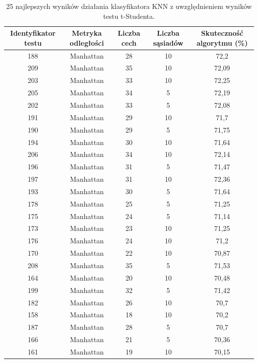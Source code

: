 \documentclass{article}
\begin{document}
\begin{center}
	\begin{longtable}{ |c|c|c|c|c| }
		\caption{25 najlepszych wyników działania klasyfikatora KNN z uwzględnieniem wyników testu t-Studenta.}
		\label{tab:wyniki_po_t}\\
		\hline
			Identyfikator testu & Metryka odległości & Liczba cech & Liczba sąsiadów & Skuteczność algorytmu (\%) \\
		\hline
            188 & Manhattan & 28 & 10 & 72,2\\
            209 & Manhattan & 35 & 10 & 72,09\\
            203 & Manhattan & 33 & 10 & 72,25\\
            205 & Manhattan & 34 & 5 & 72,19\\
            202 & Manhattan & 33 & 5 & 72,08\\
            191 & Manhattan & 29 & 10 & 71,7\\
            190 & Manhattan & 29 & 5 & 71,75\\
            194 & Manhattan & 30 & 10 & 71,64\\
            206 & Manhattan & 34 & 10 & 72,14\\
            196 & Manhattan & 31 & 5 & 71,47\\
            197 & Manhattan & 31 & 10 & 72,36\\
            193 & Manhattan & 30 & 5 & 71,64\\
            178 & Manhattan & 25 & 5 & 71,25\\
            175 & Manhattan & 24 & 5 & 71,14\\
            173 & Manhattan & 23 & 10 & 71,25\\
            176 & Manhattan & 24 & 10 & 71,2\\
            170 & Manhattan & 22 & 10 & 70,87\\
            208 & Manhattan & 35 & 5 & 71,53\\
            164 & Manhattan & 20 & 10 & 70,48\\
            199 & Manhattan & 32 & 5 & 71,42\\
            182 & Manhattan & 26 & 10 & 70,7\\
            158 & Manhattan & 18 & 10 & 70,2\\
            187 & Manhattan & 28 & 5 & 70,7\\
            166 & Manhattan & 21 & 5 & 70,36\\
            161 &Manhattan & 19 & 10 & 70,15\\
		\hline
	\end{longtable}
\end{center}
\end{document}
